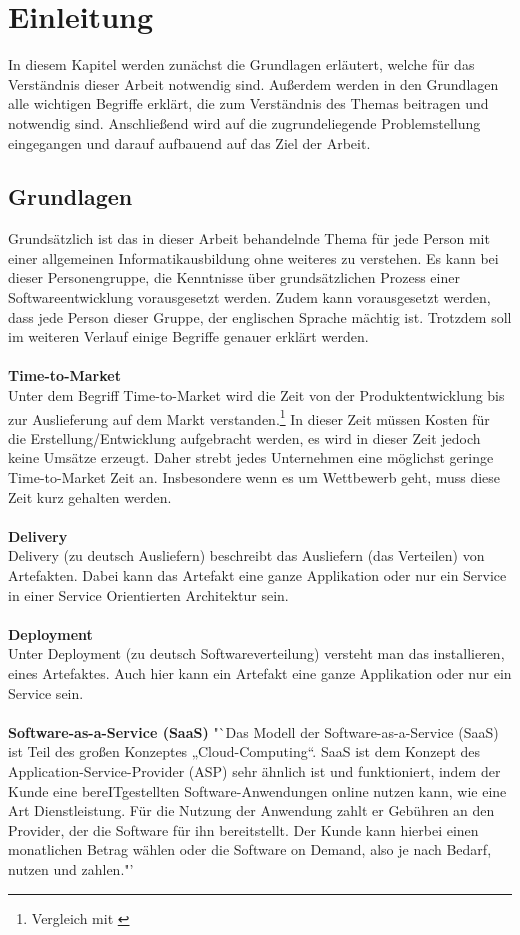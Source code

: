 \chapter{Einleitung}
\label{chap:einleitung}
In diesem Kapitel werden zunächst die Grundlagen erläutert, welche für das Verständnis dieser Arbeit notwendig sind. Außerdem werden in den Grundlagen alle wichtigen Begriffe erklärt, die zum Verständnis des Themas beitragen und notwendig sind. Anschließend wird auf die zugrundeliegende Problemstellung eingegangen und darauf aufbauend auf das Ziel der Arbeit.

\section{Grundlagen}
\label{sec:grundlagen}
Grundsätzlich ist das in dieser Arbeit behandelnde Thema für jede Person mit einer allgemeinen Informatikausbildung ohne weiteres zu verstehen. Es kann bei dieser Personengruppe, die Kenntnisse über grundsätzlichen Prozess einer Softwareentwicklung vorausgesetzt werden. Zudem kann vorausgesetzt werden, dass jede Person dieser Gruppe, der englischen Sprache mächtig ist. Trotzdem soll im weiteren Verlauf einige Begriffe genauer erklärt werden.
\\\\
\textbf{Time-to-Market}\\
Unter dem Begriff Time-to-Market wird die Zeit von der Produktentwicklung bis zur Auslieferung auf dem Markt verstanden.\footnote{Vergleich mit \cite{ttm}} In dieser Zeit müssen Kosten für die Erstellung/Entwicklung aufgebracht werden, es wird in dieser Zeit jedoch keine Umsätze erzeugt. Daher strebt jedes Unternehmen eine möglichst geringe Time-to-Market Zeit an. Insbesondere wenn es um Wettbewerb geht, muss diese Zeit kurz gehalten werden.
\\\\
\textbf{Delivery}\\
Delivery (zu deutsch Ausliefern) beschreibt das Ausliefern (das Verteilen) von Artefakten. Dabei kann das Artefakt eine ganze Applikation oder nur ein Service in einer Service Orientierten Architektur sein.
\\\\
\textbf{Deployment}\\
Unter Deployment (zu deutsch Softwareverteilung) versteht man das installieren, eines Artefaktes. Auch hier kann ein Artefakt eine ganze Applikation oder nur ein Service sein.
\\\\
\textbf{Software-as-a-Service (SaaS)}
"`Das Modell der Software-as-a-Service (SaaS) ist Teil des großen Konzeptes „Cloud-Computing“. SaaS ist dem Konzept des Application-Service-Provider (ASP) sehr ähnlich ist und funktioniert, indem der Kunde eine bereITgestellten Software-Anwendungen online nutzen kann, wie eine Art Dienstleistung. Für die Nutzung der Anwendung zahlt er Gebühren an den Provider, der die Software für ihn bereitstellt. Der Kunde kann hierbei einen monatlichen Betrag wählen oder die Software on Demand, also je nach Bedarf, nutzen und zahlen."'\cite{SaaS}

